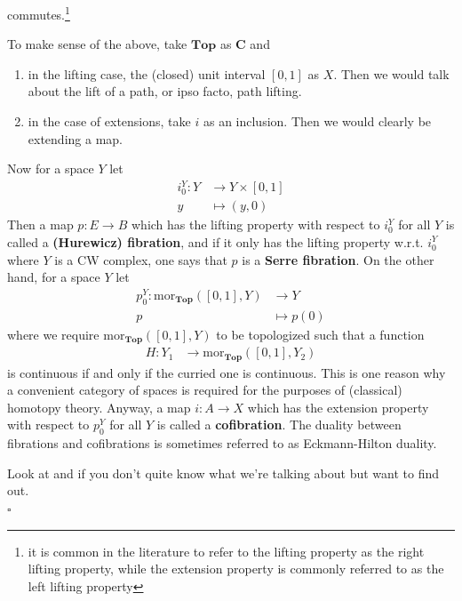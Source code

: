 commutes.\footnote{it is common in the literature to refer to the lifting property as the right lifting property, while the extension property is commonly referred to as the left lifting property}
\\
\begin{exa}
\label{exa:liftextintop}
To make sense of the above, take $\mathbf{Top}$ as $\mathbf{C}$ and
\begin{enumerate}
\item[$\bullet$]
in the lifting case, the (closed) unit interval $[0,1]$ as $X$.
Then we would talk about the lift of a path, or ipso facto, {\glqq}path lifting{\grqq}.
\item[$\bullet$]
in the case of extensions, take $i$ as an inclusion.
Then we would clearly be extending a map.
\end{enumerate}
Now for a space $Y$ let
\begin{align*}
  i_{0}^{Y}
  \colon
  Y
  &\rightarrow
  Y
  \times
  [0,1]
  \\
  y
  &\mapsto
  (y,0)
\end{align*}
Then a map $p \colon E \rightarrow B$ which has the lifting property with respect to $i_{0}^{Y}$ for all $Y$ is called a \textbf{(Hurewicz) fibration}, and if it only has the lifting property w.r.t. $i_{0}^{Y}$ where $Y$ is a CW complex, one says that $p$ is a \textbf{Serre fibration}.
On the other hand, for a space $Y$ let
\begin{align*}
  p_{0}^{Y}
  \colon
  \mathrm{mor}_{\mathbf{Top}}([0,1],Y)
  &\rightarrow
  Y
  \\
  p
  &\mapsto
  p(0)
\end{align*}
where we require $\mathrm{mor}_{\mathbf{Top}}([0,1],Y)$ to be topologized such that a function
\begin{align*}
  H
  \colon
  Y_{1}
  &\rightarrow
  \mathrm{mor}_{\mathbf{Top}}([0,1],Y_{2})
\end{align*}
is continuous if and only if the curried one is continuous.
This is one reason why a convenient category of spaces is required for the purposes of (classical) homotopy theory.
Anyway, a map $i \colon A \rightarrow X$ which has the extension property with respect to $p_{0}^{Y}$ for all $Y$ is called a \textbf{cofibration}.
The duality between fibrations and cofibrations is sometimes referred to as Eckmann-Hilton duality.
\end{exa}
\begin{prf}
Look at \cite{8b5861fc} and \cite{78202e13} if you don't quite know what we're talking about but want to find out.
\\
\phantom{proven}
\hfill
$\square$
\end{prf}
